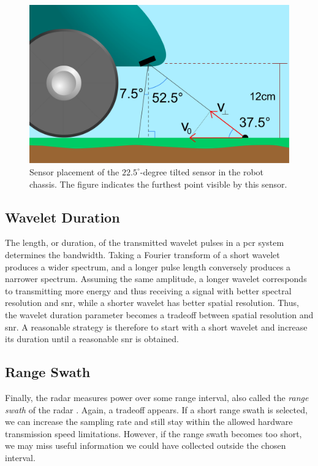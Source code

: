 \begin{figure}[t]
	\centering
	\includegraphics[scale=0.30]{figs_temp/sensor_placement.jpg}
	\caption{Sensor placement of the $22.5^\circ$-degree tilted sensor in the robot chassis. The figure indicates the furthest point visible by this sensor.}
	\label{fig:sensor_placement}
\end{figure}
\subsection{Wavelet Duration}

The length, or duration, of the transmitted wavelet pulses in a \gls{pcr} system determines the bandwidth. Taking a Fourier transform of a short wavelet produces a wider spectrum, and a longer pulse length conversely produces a narrower spectrum. Assuming the same amplitude, a longer wavelet corresponds to transmitting more energy and thus receiving a signal with better spectral resolution and \gls{snr}, while a shorter wavelet has better spatial resolution. Thus, the wavelet duration parameter becomes a tradeoff between spatial resolution and \gls{snr}. A reasonable strategy is therefore to start with a short wavelet and increase its duration until a reasonable \gls{snr} is obtained.  

\subsection{Range Swath}

Finally, the radar measures power over some range interval, also called the \emph{range swath} of the radar \citep{richards_2014}. Again, a tradeoff appears. If a short range swath is selected, we can increase the sampling rate and still stay within the allowed hardware transmission speed limitations. However, if the range swath becomes too short, we may miss useful information we could have collected outside the chosen interval. 

